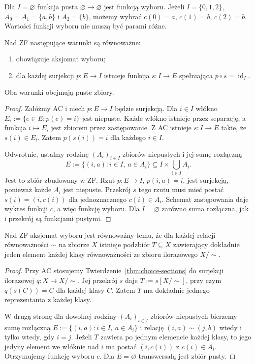 \begin{przyklad}
\label{ex:choice-empty-family}
Dla $I=\varnothing$ funkcja pusta
$\varnothing\to\varnothing$ jest funkcją wyboru.
Jeżeli $I=\{0,1,2\}$,
$A_0=A_1=\{a,b\}$ i $A_2=\{b\}$,
możemy wybrać $c(0)=a$, $c(1)=b$,
$c(2)=b$. Wartości funkcji wyboru
nie muszą być parami różne.
\end{przyklad}

\begin{twierdzenie}
\label{thm:choice-sections}
Nad ZF następujące warunki są równoważne:
\begin{enumerate}[label=(\roman*)]
\item obowiązuje aksjomat wyboru;
\item dla każdej surjekcji $p:E\to I$
istnieje funkcja $s:I\to E$ spełniająca
$p\circ s=\operatorname{id}_I$.
\end{enumerate}
Oba warunki obejmują puste zbiory.
\end{twierdzenie}
\begin{proof}
Załóżmy AC i niech $p:E\to I$ będzie surjekcją.
Dla $i\in I$ włókno
$E_i:=\{e\in E:p(e)=i\}$ jest niepuste.
Każde włókno istnieje przez separację,
a funkcja $i\mapsto E_i$ jest zbiorem przez
zastępowanie. Z AC istnieje
$s:I\to E$ takie, że $s(i)\in E_i$.
Zatem $p(s(i))=i$ dla każdego $i\in I$.

Odwrotnie, ustalmy rodzinę $(A_i)_{i\in I}$
zbiorów niepustych i jej sumę rozłączną
\[
E:=\{(i,a):i\in I,\ a\in A_i\}
\subseteq I\times\bigcup_{i\in I}A_i.
\]
Jest to zbiór zbudowany w ZF.
Rzut $p:E\to I$, $p(i,a)=i$,
jest surjekcją, ponieważ każde $A_i$ jest niepuste.
Przekrój $s$ tego rzutu musi mieć postać
$s(i)=(i,c(i))$ dla jednoznacznego
$c(i)\in A_i$. Schemat zastępowania daje
wykres funkcji $c$, a więc funkcję wyboru.
Dla $I=\varnothing$ zarówno suma rozłączna,
jak i przekrój są funkcjami pustymi.
\end{proof}

\begin{wniosek}
\label{cor:choice-transversals}
Nad ZF aksjomat wyboru jest równoważny temu,
że dla każdej relacji równoważności $\sim$
na zbiorze $X$ istnieje podzbiór $T\subseteq X$
zawierający dokładnie jeden element każdej klasy
równoważności ze zbioru ilorazowego $X/{\sim}$.
\end{wniosek}
\begin{proof}
Przy AC stosujemy Twierdzenie~\ref{thm:choice-sections}
do surjekcji ilorazowej $q:X\to X/{\sim}$.
Jej przekrój $s$ daje
$T:=s[X/{\sim}]$, przy czym
$q(s(C))=C$ dla każdej klasy $C$.
Zatem $T$ ma dokładnie jednego reprezentanta
z każdej klasy.

W drugą stronę dla dowolnej rodziny
$(A_i)_{i\in I}$ zbiorów niepustych
bierzemy sumę rozłączną
$E:=\{(i,a):i\in I,\ a\in A_i\}$
i relację $(i,a)\sim(j,b)$
wtedy i tylko wtedy, gdy $i=j$.
Jeżeli $T$ zawiera po jednym elemencie
każdej klasy, to jego jedyny element
we włóknie nad $i$ ma postać
$(i,c(i))$ z $c(i)\in A_i$.
Otrzymujemy funkcję wyboru $c$.
Dla $E=\varnothing$ transwersalą jest
zbiór pusty.
\end{proof}

